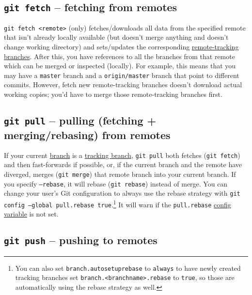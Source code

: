 \documentclass[table, xcdraw]{article}%
\begin{document}
\subsection{\texttt{git fetch} -- fetching from remotes} \label{fetch}

\texttt{git fetch <remote>} (only) fetches/downloads all data from the specified remote that isn't already locally available (but doesn't merge anything and doesn't change working directory) and sets/updates the corresponding \hyperref[remotes]{remote-tracking branches}. After this, you have references to all the branches from that remote which can be merged or inspected (locally). For example, this means that you may have a \texttt{master} branch and a \texttt{origin/master} branch that point to different commits. However, fetch new remote-tracking branches doesn't download actual working copies; you'd have to merge those remote-tracking branches first.

\subsection{\texttt{git pull} -- pulling (fetching + merging/rebasing) from remotes} \label{pull}

If your current \hyperref[branching]{branch} is a \hyperref[remotes]{tracking branch}, \texttt{git pull} both fetches (\texttt{git fetch}) and then fast-forwards if possible, or, if the current branch and the remote have diverged, merges (\texttt{git merge}) that remote branch into your current branch. If you specify \texttt{--rebase}, it will rebase (\texttt{git rebase}) instead of merge. You can change your user's Git configuration to always use the rebase strategy with \texttt{git config --global pull.rebase true}.\footnote{You can also set \texttt{branch.autosetuprebase} to \texttt{always} to have newly created tracking branches set \texttt{branch.<branchname>.rebase} to \texttt{true}, so those are automatically using the rebase strategy as well.}
It will warn if the \texttt{pull.rebase} \hyperref[config]{config variable} is not set.

\subsection{\texttt{git push} -- pushing to remotes} \label{push}
\end{document}
